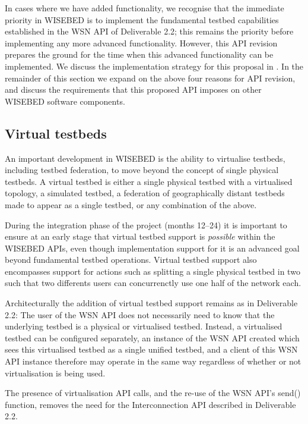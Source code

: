 In cases where we have added functionality, we recognise that the immediate priority in WISEBED is to implement the fundamental testbed capabilities established in the WSN API of Deliverable 2.2; this remains the priority before implementing any more advanced functionality. However, this API revision prepares the ground for the time when this advanced functionality can be implemented. We discuss the implementation strategy for this proposal in . In the remainder of this section we expand on the above four reasons for API revision, and discuss the requirements that this proposed API imposes on other WISEBED software components.

		\subsection{Virtual testbeds}
An important development in WISEBED is the ability to virtualise testbeds, including testbed federation, to move beyond the concept of single physical testbeds. A virtual testbed is either a single physical testbed with a virtualised topology, a simulated testbed, a federation of geographically distant testbeds made to appear as a single testbed, or any combination of the above.

During the integration phase of the project (months 12--24) it is important to ensure at an early stage that virtual testbed support is {\em possible} within the WISEBED APIs, even though implementation support for it is an advanced goal beyond fundamental testbed operations. Virtual testbed support also encompasses support for actions such as splitting a single physical testbed in two such that two differents users can concurrenctly use one half of the network each.

Architecturally the addition of virtual testbed support remains as in Deliverable 2.2: The user of the WSN API does not necessarily need to know that the underlying testbed is a physical or virtualised testbed. Instead, a virtualised testbed can be configured separately, an instance of the WSN API created which sees this virtualised testbed as a single unified testbed, and a client of this WSN API instance therefore may operate in the same way regardless of whether or not virtualisation is being used.

The presence of virtualisation API calls, and the re-use of the WSN API's send() function, removes the need for the Interconnection API described in Deliverable 2.2.

